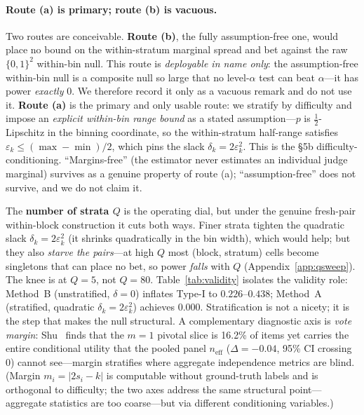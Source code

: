 \documentclass{article}
\begin{document}
\paragraph{Route (a) is primary; route (b) is vacuous.}
Two routes are conceivable. \textbf{Route (b)}, the fully assumption-free one,
would place no bound on the within-stratum marginal spread and bet against the
raw $\{0,1\}^2$ within-bin null. This route is \emph{deployable in name only}: the
assumption-free within-bin null is a composite null so large that no level-$\alpha$
test can beat $\alpha$---it has power \emph{exactly} $0$. We therefore record it
only as a vacuous remark and do not use it. \textbf{Route (a)} is the primary and
only usable route: we stratify by difficulty and impose an \emph{explicit
within-bin range bound} as a stated assumption---$p$ is $\tfrac12$-Lipschitz in
the binning coordinate, so the within-stratum half-range satisfies $\varepsilon_k
\le (\max-\min)/2$, which pins the slack $\delta_k = 2\varepsilon_k^2$. This is the
\S5b difficulty-conditioning. ``Margins-free'' (the estimator never estimates an
individual judge marginal) survives as a genuine property of route (a);
``assumption-free'' does not survive, and we do not claim it.

The \textbf{number of strata $Q$} is the operating dial, but under the genuine
fresh-pair within-block construction it cuts both ways. Finer strata tighten the
quadratic slack $\delta_k=2\varepsilon_k^2$ (it shrinks quadratically in the bin
width), which would help; but they also \emph{starve the pairs}---at high $Q$ most
(block, stratum) cells become singletons that can place no bet, so power
\emph{falls} with $Q$ (Appendix~\ref{app:qsweep}). The knee is at $Q=5$, not
$Q=80$. Table~\ref{tab:validity} isolates the validity role:
Method~B (unstratified, $\delta=0$) inflates Type-I to $0.226$--$0.438$;
Method~A (stratified, quadratic $\delta_k=2\varepsilon_k^2$) achieves $0.000$.
Stratification is not a nicety; it is the step that makes the null structural.
A complementary diagnostic axis is \emph{vote margin}: Shu~\citep{shu2608} finds that the $m{=}1$ pivotal slice is 16.2\% of items yet carries the entire conditional utility that the pooled panel $n_{\mathrm{eff}}$ ($\Delta = {-}0.04$, 95\% CI crossing 0) cannot see---margin stratifies where aggregate independence metrics are blind.
(Margin $m_i = |2s_i - k|$ is computable without ground-truth labels and is orthogonal to difficulty; the two axes address the same structural point---aggregate statistics are too coarse---but via different conditioning variables.)
\end{document}
